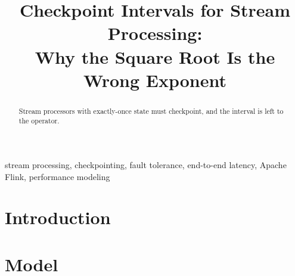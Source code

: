 \documentclass[conference]{IEEEtran}
\begin{document}
\title{Checkpoint Intervals for Stream Processing:\\
       Why the Square Root Is the Wrong Exponent}

\author{
}

\maketitle

\begin{abstract}
Stream processors with exactly-once state must checkpoint, and the interval is
left to the operator.
\end{abstract}

\begin{IEEEkeywords}
stream processing, checkpointing, fault tolerance, end-to-end latency,
Apache Flink, performance modeling
\end{IEEEkeywords}

\section{Introduction}
%


\section{Model}
\label{sec:model}

\end{document}
